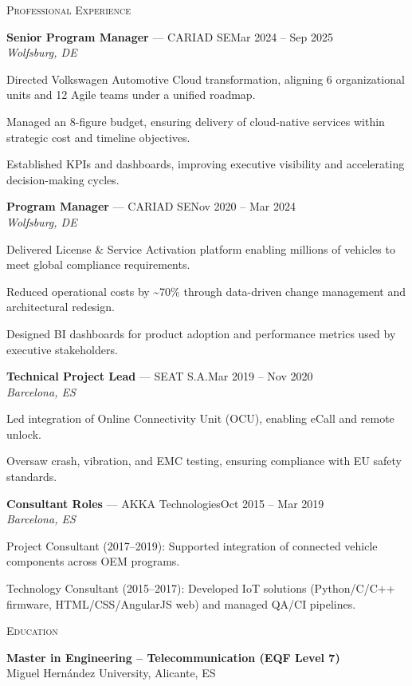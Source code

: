 \documentclass[11pt,a4paper]{article}
\newcommand{\headright}[1]{\vspace{1.6ex}\textsc{\large\color{cvblue}#1}\par%
  \vspace*{-0.6ex}{\color{cvblue}\hrulefill}\par\vspace*{0.4ex}}
\newlength{\SideBarW}
\newenvironment{job}[4]{%
  \vspace{1.0ex}%
  \noindent\textbf{#2} {\color{darkgray}--- #1}\hfill {\small #3}\\%
  {\small\itshape #4}\par
  \begin{list}{--}{%
      \setlength{\leftmargin}{1.4em}%
      \setlength{\labelsep}{0.5em}%
      \setlength{\itemsep}{0.2ex}%
      \setlength{\topsep}{0.2ex}%
      \setlength{\rightmargin}{6mm}%
      \setlength{\listparindent}{0pt}%
      \setlength{\parsep}{0pt}%
    }%
}{\end{list}}
\begin{document}
\begin{minipage}[t]{\textwidth}
\begin{minipage}[t]{\dimexpr\textwidth-\SideBarW-4mm\relax}
  \headright{Professional Experience}
  \vspace*{-0.5ex}

  \begin{job}{CARIAD SE}{Senior Program Manager}{Mar 2024 -- Sep 2025}{Wolfsburg, DE}
    \item Directed Volkswagen Automotive Cloud transformation, aligning 6 organizational units and 12 Agile teams under a unified roadmap.
    \item Managed an 8-figure budget, ensuring delivery of cloud-native services within strategic cost and timeline objectives.
    \item Established KPIs and dashboards, improving executive visibility and accelerating decision-making cycles.
  \end{job}

  \begin{job}{CARIAD SE}{Program Manager}{Nov 2020 -- Mar 2024}{Wolfsburg, DE}
    \item Delivered License \& Service Activation platform enabling millions of vehicles to meet global compliance requirements.
    \item Reduced operational costs by \textasciitilde70\% through data-driven change management and architectural redesign.
    \item Designed BI dashboards for product adoption and performance metrics used by executive stakeholders.
  \end{job}

  \begin{job}{SEAT S.A.}{Technical Project Lead}{Mar 2019 -- Nov 2020}{Barcelona, ES}
    \item Led integration of Online Connectivity Unit (OCU), enabling eCall and remote unlock.
    \item Oversaw crash, vibration, and EMC testing, ensuring compliance with EU safety standards.
  \end{job}

  \begin{job}{AKKA Technologies}{Consultant Roles}{Oct 2015 -- Mar 2019}{Barcelona, ES}
    \item Project Consultant (2017--2019): Supported integration of connected vehicle components across OEM programs.
    \item Technology Consultant (2015--2017): Developed IoT solutions (Python/C/C++ firmware, HTML/CSS/AngularJS web) and managed QA/CI pipelines.
  \end{job}

  \headright{Education}
  \vspace*{-0.5ex}
  \textbf{Master in Engineering – Telecommunication (EQF Level 7)} \\
  Miguel Hernández University, Alicante, ES

\end{minipage}

\end{minipage}
\end{document}
